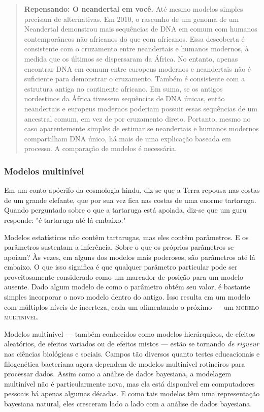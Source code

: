 \begin{quote}
  \textbf{Repensando: O neandertal em você.} Até mesmo modelos simples precisam de alternativas. Em 2010, o rascunho de um genoma de um Neandertal demonstrou mais sequências de DNA em comum com humanos contemporâneos não africanos do que com africanos. Essa descoberta é consistente com o cruzamento entre neandertais e humanos modernos, à medida que os últimos se dispersaram da África. No entanto, apenas encontrar DNA em comum entre europeus modernos e neandertais não é suficiente para demonstrar o cruzamento. Também é consistente com a estrutura antiga no continente africano. Em suma, se os antigos nordestinos da África tivessem sequências de DNA únicas, então neandertais e europeus modernos poderiam possuir essas sequências de um ancestral comum, em vez de por cruzamento direto. Portanto, mesmo no caso aparentemente simples de estimar se neandertais e humanos modernos compartilham DNA único, há mais de uma explicação baseada em processo. A comparação de modelos é necessária.
\end{quote}

\subsubsection{Modelos multinível}

Em um conto apócrifo da cosmologia hindu, diz-se que a Terra repousa nas costas de um grande elefante, que por sua vez fica nas costas de uma enorme tartaruga. Quando perguntado sobre o que a tartaruga está apoiada, diz-se que um guru responde: "é tartaruga até lá embaixo."

Modelos estatísticos não contêm tartarugas, mas eles contêm parâmetros. E os parâmetros sustentam a inferência. Sobre o que os próprios parâmetros se apoiam? Às vezes, em alguns dos modelos mais poderosos, são parâmetros até lá embaixo. O que isso significa é que qualquer parâmetro particular pode ser proveitosamente considerado como um marcador de posição para um modelo ausente. Dado algum modelo de como o parâmetro obtém seu valor, é bastante simples incorporar o novo modelo dentro do antigo. Isso resulta em um modelo com múltiplos níveis de incerteza, cada um alimentando o próximo — um \textsc{modelo multinível}.

Modelos multinível — também conhecidos como modelos hierárquicos, de efeitos aleatórios, de efeitos variados ou de efeitos mistos — estão se tornando \textit{de rigueur} nas ciências biológicas e sociais. Campos tão diversos quanto testes educacionais e filogenética bacteriana agora dependem de modelos multinível rotineiros para processar dados. Assim como a análise de dados bayesiana, a modelagem multinível não é particularmente nova, mas ela está disponível em computadores pessoais há apenas algumas décadas. E como tais modelos têm uma representação bayesiana natural, eles cresceram lado a lado com a análise de dados bayesiana.

